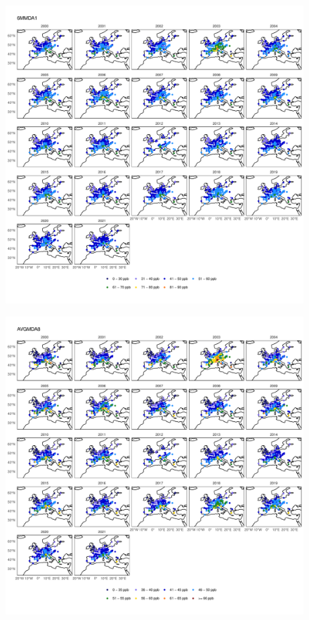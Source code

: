 \documentclass{article}
\begin{document}
\begin{figure}
\centering
\includegraphics[height=0.9\textheight]{figures/si_figures/fS13_metric_map_Europe_6MMDA1.pdf}
\caption{}
\label{si_fig:metric_map_eu_6MMDA1}
\end{figure}
\clearpage

\begin{figure}
\centering
\includegraphics[height=0.9\textheight]{figures/si_figures/fS14_metric_map_Europe_AVGMDA8.pdf}
\caption{}
\label{si_fig:metric_map_eu_AVGMDA8}
\end{figure}
\clearpage
\end{document}
